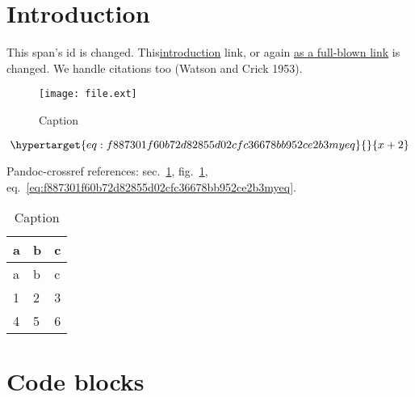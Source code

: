 \hypertarget{sec:f887301f60b72d82855d02cfc36678bb952ce2b3intro}{%
\section{Introduction}\label{sec:f887301f60b72d82855d02cfc36678bb952ce2b3intro}}

\protect\hypertarget{9210402039f6de27e109aad91536dbb424f40b80ref}{}{This
span's id} is changed.
This\protect\hyperlink{sec:f887301f60b72d82855d02cfc36678bb952ce2b3intro}{introduction}
link, or again \protect\hyperlink{introduction}{as a full-blown link} is
changed. We handle citations too (Watson and Crick 1953).

\begin{figure}
\hypertarget{fig:f887301f60b72d82855d02cfc36678bb952ce2b3image}{%
\centering
\texttt{[image: file.ext]}
\caption{Caption}\label{fig:f887301f60b72d82855d02cfc36678bb952ce2b3image}
}
\end{figure}

\begin{equation}\protect\hypertarget{eq:f887301f60b72d82855d02cfc36678bb952ce2b3myeq}{}{x + 2}\label{eq:f887301f60b72d82855d02cfc36678bb952ce2b3myeq}\end{equation}

Pandoc-crossref references:
sec.~\ref{sec:f887301f60b72d82855d02cfc36678bb952ce2b3intro},
fig.~\ref{fig:f887301f60b72d82855d02cfc36678bb952ce2b3image},
eq.~\ref{eq:f887301f60b72d82855d02cfc36678bb952ce2b3myeq}.

\hypertarget{tbl:f887301f60b72d82855d02cfc36678bb952ce2b3label}{}
\begin{longtable}[]{@{}lll@{}}
\caption{\label{tbl:f887301f60b72d82855d02cfc36678bb952ce2b3label}Caption}\tabularnewline
\toprule
a & b & c \\
\midrule
\endfirsthead
\toprule
a & b & c \\
\midrule
\endhead
1 & 2 & 3 \\
4 & 5 & 6 \\
\bottomrule
\end{longtable}

\hypertarget{9210402039f6de27e109aad91536dbb424f40b80f887301f60b72d82855d02cfc36678bb952ce2b3code-blocks}{%
\section{Code
blocks}\label{9210402039f6de27e109aad91536dbb424f40b80f887301f60b72d82855d02cfc36678bb952ce2b3code-blocks}}

